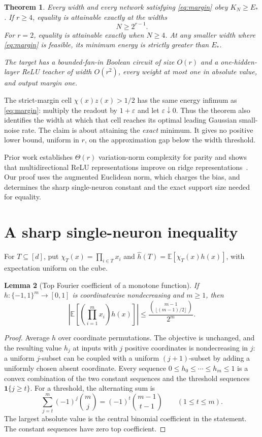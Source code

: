 \documentclass[11pt]{article}
\newtheorem{theorem}{Theorem}
\newtheorem{lemma}[theorem]{Lemma}
\newcommand{\E}{\mathbb E}
\begin{document}
\begin{theorem}\label{thm:main}
Every width and every network satisfying \eqref{eq:margin} obey
$K_N\ge E_*$. If $r\ge4$, equality is attainable exactly at the widths
\[
 N\ge2^{r-1}.
\]
For $r=2$, equality is attainable exactly when $N\ge4$.
At any smaller width where \eqref{eq:margin} is feasible, its minimum
energy is strictly greater than $E_*$.

The target has a bounded-fan-in Boolean circuit of size $O(r)$ and a
one-hidden-layer ReLU teacher of width $O(r^2)$, every weight at most
one in absolute value, and output margin one.
\end{theorem}

The strict-margin cell $\chi(x)z(x)>1/2$ has the same energy infimum as
\eqref{eq:margin}: multiply the readout by $1+\varepsilon$ and let
$\varepsilon\downarrow0$. Thus the theorem also identifies the width
at which that cell reaches its optimal leading Gaussian small-noise
rate. The claim is about attaining the \emph{exact} minimum. It gives no
positive lower bound, uniform in $r$, on the approximation gap below
the width threshold.

Prior work establishes $\Theta(r)$ variation-norm complexity for parity
and shows that multidirectional ReLU representations improve on ridge
representations~\cite{ardeshir}. Our proof uses the augmented Euclidean
norm, which charges the bias, and determines the sharp single-neuron
constant and the exact support size needed for equality.

\section{A sharp single-neuron inequality}

For $T\subseteq[d]$, put $\chi_T(x)=\prod_{i\in T}x_i$ and
$\widehat h(T)=\E[\chi_T(x)h(x)]$, with expectation uniform on the cube.

\begin{lemma}[Top Fourier coefficient of a monotone function]
\label{lem:monotone}
If $h:\{-1,1\}^m\to[0,1]$ is coordinatewise nondecreasing and $m\ge1$,
then
\[
 \left|\E\!\left[\left(\prod_{i=1}^m x_i\right)h(x)\right]\right|
 \le\frac{\binom{m-1}{\lfloor(m-1)/2\rfloor}}{2^m}.
\]
\end{lemma}
\begin{proof}
Average $h$ over coordinate permutations. The objective is unchanged,
and the resulting value $h_j$ at inputs with $j$ positive coordinates
is nondecreasing in $j$: a uniform $j$-subset can be coupled with a
uniform $(j+1)$-subset by adding a uniformly chosen absent coordinate.
Every sequence $0\le h_0\le\cdots\le h_m\le1$ is a convex combination
of the two constant sequences and the threshold sequences
$\mathbf1\{j\ge t\}$. For a threshold, the alternating sum is
\[
 \sum_{j=t}^m(-1)^j\binom mj=(-1)^t\binom{m-1}{t-1}
 \qquad(1\le t\le m).
\]
The largest absolute value is the central binomial coefficient in the
statement. The constant sequences have zero top coefficient.
\end{proof}
\end{document}
